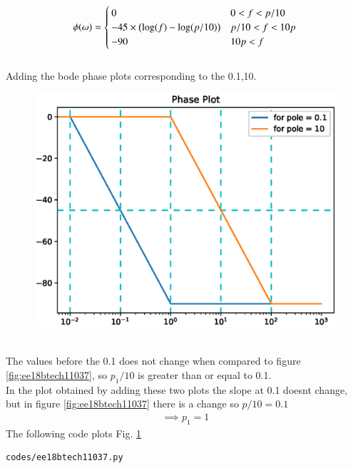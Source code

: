 \begin{enumerate}[label=\thesubsection.\arabic*.,ref=\thesubsection.\theenumi]
\begin{align}
 \phi(\omega) = 
 \begin{cases} 
        0 & 0<f< p/10 \\
      -45\times\left(\log(f)-\log(p/10)\right)& p/10<f<10p \\
      -90 & 10p<f  
 \end{cases}
\end{align}
\\
Adding the bode phase plots corresponding to the 0.1,10.
\begin{figure}[!ht]
\centering
\includegraphics[width=\columnwidth]{figs/ee18btech11037/ee18btech11037_2.eps}
\caption{}
\label{fig:ee18btech11037_2}
\end{figure}
\\
The values before the 0.1 does not change when compared to figure \ref{fig:ee18btech11037}, so $p_1/10$ is greater than or equal to 0.1.
\\
In the plot obtained by adding these two plots the slope at 0.1 doesnt change, but in figure \ref{fig:ee18btech11037} there is a change so $p/10 = 0.1 $ 
\begin{align}
\implies p_1 = 1
\end{align}
The following code plots Fig. \ref{fig:ee18btech11037_2}

\begin{lstlisting}
codes/ee18btech11037.py
\end{lstlisting}

\end{enumerate}
